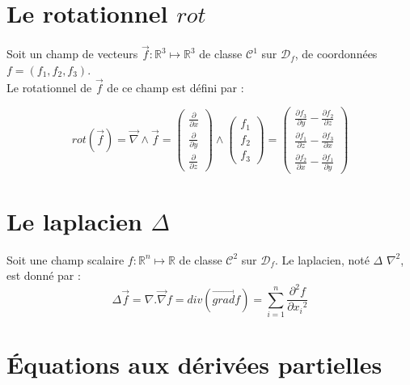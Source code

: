 \section{Le rotationnel $rot$}
\begin{defi}
Soit un champ de vecteurs $\overrightarrow{f}:\mathbb{R}^3\mapsto\mathbb{R}^3$ de classe $\mathscr{C}^1$ sur $\mathscr{D}_f$, de coordonnées\\ $f=(f_1,f_2,f_3)$.\\
Le rotationnel de $\overrightarrow{f}$ de ce champ est défini par :

$$rot(\overrightarrow{f})=\overrightarrow{\nabla}\land\overrightarrow{f}=\begin{pmatrix}\frac{\partial}{\partial x}\\\frac{\partial}{\partial y}\\\frac{\partial}{\partial z}\end{pmatrix}\land\begin{pmatrix}f_1\\f_2\\f_3\end{pmatrix}=\begin{pmatrix}\frac{\partial f_3}{\partial y}-\frac{\partial f_2}{\partial z}\\\frac{\partial f_1}{\partial z}-\frac{\partial f_3}{\partial x}\\\frac{\partial f_2}{\partial x}-\frac{\partial f_1}{\partial y}\end{pmatrix}$$
\end{defi}

\section{Le laplacien $\Delta$}
\begin{defi}
Soit une champ scalaire $f:\mathbb{R}^n\mapsto\mathbb{R}$ de classe $\mathscr{C}^2$ sur $\mathscr{D}_f$.
Le laplacien, noté $\Delta$ $\nabla^2$, est donné par :
$$\Delta \overrightarrow{f}=\nabla . \overrightarrow{\nabla} f = div(\overrightarrow{grad}f)=\sum_{i=1}^n \frac{\partial^2 f}{\partial {x_i}^2}$$
\end{defi}
\section{Équations aux dérivées partielles}